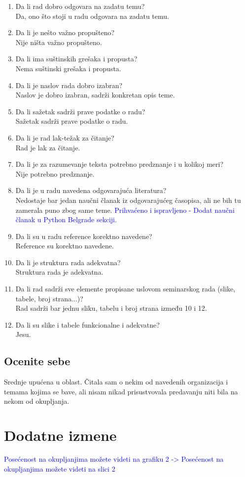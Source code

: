 \documentclass[a4paper]{report}
\newcommand{\odgovor}[1]{\textcolor{blue}{#1}}
\begin{document}
\begin{enumerate}
\item Da li rad dobro odgovara na zadatu temu?\\
Da, ono što stoji u radu odgovara na zadatu temu.
\item Da li je nešto važno propušteno?\\
Nije ništa važno propušteno.
\item Da li ima suštinskih grešaka i propusta?\\
Nema suštinski grešaka i propusta.
\item Da li je naslov rada dobro izabran?\\
Naslov je dobro izabran, sadrži konkretan opis teme.
\item Da li sažetak sadrži prave podatke o radu?\\
Sažetak sadrži prave podatke o radu.
\item Da li je rad lak-težak za čitanje?\\
Rad je lak za čitanje.
\item Da li je za razumevanje teksta potrebno predznanje i u kolikoj meri?\\
Nije potrebno predznanje.
\item Da li je u radu navedena odgovarajuća literatura?\\
Nedostaje bar jedan naučni članak iz odgovarajućeg časopisa, ali ne bih tu zamerala puno zbog same teme.
\odgovor{Prihvaćeno i ispravljeno - Dodat naučni članak u Python Belgrade sekciji.}
\item Da li su u radu reference korektno navedene?\\
Reference su korektno navedene.
\item Da li je struktura rada adekvatna?\\
Struktura rada je adekvatna.
\item Da li rad sadrži sve elemente propisane uslovom seminarskog rada (slike, tabele, broj strana...)?\\
Rad sadrži bar jednu sliku, tabelu i broj strana između 10 i 12.
\item Da li su slike i tabele funkcionalne i adekvatne?\\
Jesu.
\end{enumerate}

\section{Ocenite sebe}
Srednje upućena u oblast. Čitala sam o nekim od navedenih organizacija i temama kojima se bave, ali nisam nikad prisustvovala predavanju niti  bila na nekom od okupljanja.


\chapter{Dodatne izmene}
\odgovor{Posećenost na okupljanjima možete videti na grafiku 2 -> Posećenost na okupljanjima možete videti na slici 2}
\end{document}
